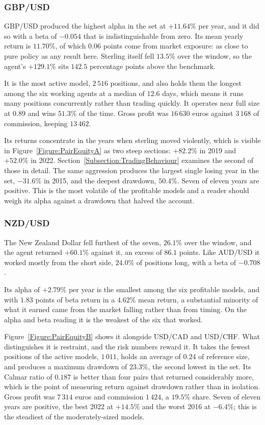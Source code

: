\subsubsection{GBP/USD}

GBP/USD produced the highest alpha in the set at $+11.64\%$ per year, and it did so with a beta of $-0.054$ that is indistinguishable from zero. Its mean yearly return is $11.70\%$, of which $0.06$ points come from market exposure: as close to pure policy as any result here. Sterling itself fell $13.5\%$ over the window, so the agent's $+129.1\%$ sits $142.5$ percentage points above the benchmark.

It is the most active model, $2\,516$ positions, and also holds them the longest among the six working agents at a median of $12.6$ days, which means it runs many positions concurrently rather than trading quickly. It operates near full size at $0.89$ and wins $51.3\%$ of the time. Gross profit was $16\,630$ euros against $3\,168$ of commission, keeping $13\,462$.

Its returns concentrate in the years when sterling moved violently, which is visible in Figure~\ref{Figure:PairEquityA} as two steep sections: $+82.2\%$ in 2019 and $+52.0\%$ in 2022. Section~\ref{Subsection:TradingBehaviour} examines the second of those in detail. The same aggression produces the largest single losing year in the set, $-31.6\%$ in 2015, and the deepest drawdown, $50.4\%$. Seven of eleven years are positive. This is the most volatile of the profitable models and a reader should weigh its alpha against a drawdown that halved the account.

\subsubsection{NZD/USD}

The New Zealand Dollar fell furthest of the seven, $26.1\%$ over the window, and the agent returned $+60.1\%$ against it, an excess of $86.1$ points. Like AUD/USD it worked mostly from the short side, $24.0\%$ of positions long, with a beta of $-0.708$.

Its alpha of $+2.79\%$ per year is the smallest among the six profitable models, and with $1.83$ points of beta return in a $4.62\%$ mean return, a substantial minority of what it earned came from the market falling rather than from timing. On the alpha and beta reading it is the weakest of the six that worked.

Figure~\ref{Figure:PairEquityB} shows it alongside USD/CAD and USD/CHF. What distinguishes it is restraint, and the risk numbers reward it. It takes the fewest positions of the active models, $1\,011$, holds an average of $0.24$ of reference size, and produces a maximum drawdown of $23.3\%$, the second lowest in the set. Its Calmar ratio of $0.187$ is better than four pairs that returned considerably more, which is the point of measuring return against drawdown rather than in isolation. Gross profit was $7\,314$ euros and commission $1\,424$, a $19.5\%$ share. Seven of eleven years are positive, the best 2022 at $+14.5\%$ and the worst 2016 at $-6.4\%$; this is the steadiest of the moderately-sized models.

